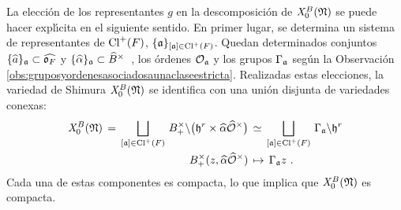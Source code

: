 La elecci\'{o}n de los representantes $g$ en la descomposici\'{o}n de
$\shimura[B]{\frak{N}}$ se puede hacer expl\'{\i}cita en el siguiente sentido.
En primer lugar, se determina un sistema de representantes de $\pClass{F}$,
$\{\frak{a}\}_{[\frak{a}]\in\pClass{F}}$. Quedan determinados conjuntos
\begin{math}
	\{\hhat{a}\}_{\frak{a}}\subset\Adfin{\oka{F}}
\end{math}
y
\begin{math}
	\{\hhat{\alpha}\}_{\frak{a}}\subset\Idfin{B}
\end{math}~,
los \'{o}rdenes $\cal{O}_{\frak{a}}$ y los grupos $\Gamma_{\frak{a}}$
seg\'{u}n la Observaci\'{o}n
\ref{obs:gruposyordenesasociadosaunaclaseestricta}. Realizadas estas
elecciones, la variedad de Shimura $\shimura[B]{\frak{N}}$ se identifica con
una uni\'{o}n disjunta de variedades conexas:
\begin{equation}
	\label{eq:descomposicionvariedaddeshimuraindefinida}
\begin{aligned}
	\shimura[B]{\frak{N}} \,=\,
		\bigsqcup_{[\frak{a}]\in\pClass{F}}\,
			B_{+}^{\times}\backslash\big(\hP^{r}\times
				\hhat{\alpha}\Idfin{\cal{O}}\big)
		& \,\simeq\,
		\bigsqcup_{[\frak{a}]\in\pClass{F}}\,
		\Gamma_{\frak{a}}\backslash\hP^{r} \\
	B_{+}^{\times}(z,\hhat{\alpha}\Idfin{\cal{O}}) & \,\mapsto\,
		\Gamma_{\frak{a}}z
	\text{ .}
\end{aligned}
\end{equation}
%
Cada una de estas componentes es compacta, lo que implica que
$\shimura[B]{\frak{N}}$ es compacta.

